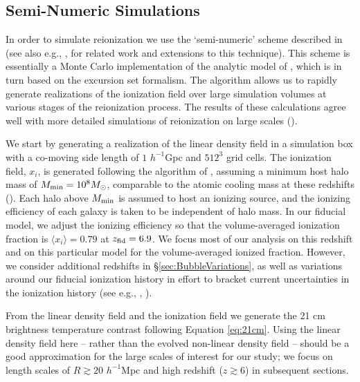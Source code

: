 \subsection{Semi-Numeric Simulations} \label{sec:Bubblesims}

In order to simulate reionization we use the `semi-numeric' scheme described in 
\citet{Zahn:2006sg} (see also e.g., \citealt{Mesinger:2010ne}, for related work and extensions to this technique). This scheme is essentially a Monte Carlo implementation
of the analytic model of \citet{Furlanetto:2004nh}, which is in turn based
on the excursion set formalism. The \citet{Zahn:2006sg} algorithm allows us to rapidly generate
realizations of the ionization field over large simulation volumes at various
stages of the reionization process. The results of these calculations agree well with
more detailed simulations of reionization on large scales (\citealt{Zahn:2006sg,Zahn:2010yw}). 

We start by generating a realization of the linear density field in a simulation
box with a co-moving side length of $1$ $h^{-1}$Gpc and $512^3$ grid cells. The
ionization field, $x_i$, is generated following the algorithm of \citet{Zahn:2006sg},
assuming a minimum host halo mass of $M_{\rm min} = 10^8 M_\odot$, comparable
to the atomic cooling mass at these redshifts (\citealt{Barkana:2000fd}). Each halo above $M_{\rm min}$
is assumed to host an ionizing source, and the ionizing efficiency of each galaxy is taken to be 
independent of halo mass. In our fiducial model, we adjust the ionizing efficiency
so that the volume-averaged ionization fraction is $\langle x_i \rangle = 0.79$ at
$z_{\rm fid} = 6.9$. We focus most of our analysis on this redshift and on this
particular model for the volume-averaged ionized fraction. However, we consider additional 
redshifts in \S\ref{sec:BubbleVariations}, as well as variations around our fiducial
ionization history in effort to bracket current uncertainties in the ionization history (see 
e.g., \citealt{Kuhlen:2012vy}, \citealt{Zahn:2011vp}).

From the linear density field
and the ionization field we generate the 21 cm brightness temperature
contrast following Equation \ref{eq:21cm}.  Using the linear density field here -- rather
than the evolved non-linear density field -- should be a good approximation for the large
scales of interest for our study; we focus on length scales of $R \gtrsim 20$ $h^{-1}$Mpc and high redshift ($z \gtrsim 6$) 
in subsequent sections. 

